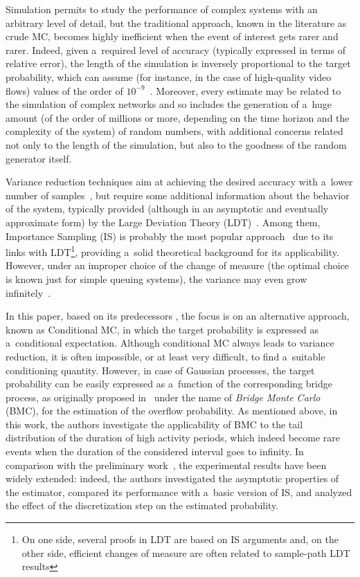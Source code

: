 \begin{multicols}{2}
Simulation permits to study the performance of complex systems
with an arbitrary level of detail, but the traditional approach, known in the 
literature as crude MC, becomes highly inefficient when the event 
of interest gets rarer and
rarer. Indeed, given a~required level of accuracy (typically expressed in terms 
of relative error), the length of the simulation is inversely proportional to the target probability,
which can assume (for instance, in the case of high-quality video flows) values of the
order of $10^{-9}$~\cite{Demetres}. Moreover, every estimate may be related to 
the simulation of complex networks and so includes the generation of a~huge 
amount (of the order of millions or more,
depending on the time horizon and the complexity of the system) of random numbers, 
with additional concerns related not only to the length of the simulation, but 
also to the goodness of the random generator itself.

Variance reduction techniques aim at achieving the desired accuracy with a~lower 
number of samples~\cite{Ross}, but require some
additional information about the behavior of the system, typically provided  
(although in an asymptotic and eventually approximate form) by the Large Deviation 
Theory (LDT)~\cite{BigQueues}.
Among them,  Importance Sampling (IS) is probably the most popular 
approach~\cite{Heidelberger} due to its links with 
LDT\footnote{On one side, several proofs in LDT are based on IS arguments and, 
on the other side, efficient changes of measure are often related to sample-path 
LDT results}, providing a~solid theoretical background for its applicability. 
However, under an improper choice of the change of measure (the optimal choice 
is known just for simple queuing systems), the variance may even grow 
infinitely~\cite{glasserman1997}.

In this paper, based on its predecessors \cite{dccn,Tomsk}, the focus is on 
an alternative approach, known as Conditional MC, in which the target probability 
is expressed as a~conditional expectation. Although conditional MC always leads 
to variance reduction, it is often impossible, or at least very difficult, 
to find a~suitable conditioning quantity. However, in case of Gaussian processes, 
the target probability can be easily expressed as a~function of the corresponding 
bridge process, as originally
proposed in~\cite{Giordano} under the name of \textit{Bridge Monte Carlo} (BMC), 
for the estimation of the overflow probability. As mentioned above, in this work, 
the authors investigate the applicability of BMC to the tail distribution of the duration 
of high activity periods, which indeed become  rare events when the duration 
of the considered interval goes to infinity. In comparison with the preliminary 
work~\cite{dccn}, the experimental results have been widely extended: indeed, 
the authors investigated the asymptotic properties of the estimator, compared its 
performance with a~basic version of IS, and analyzed the effect of the 
discretization step on the estimated probability.



\end{multicols}
